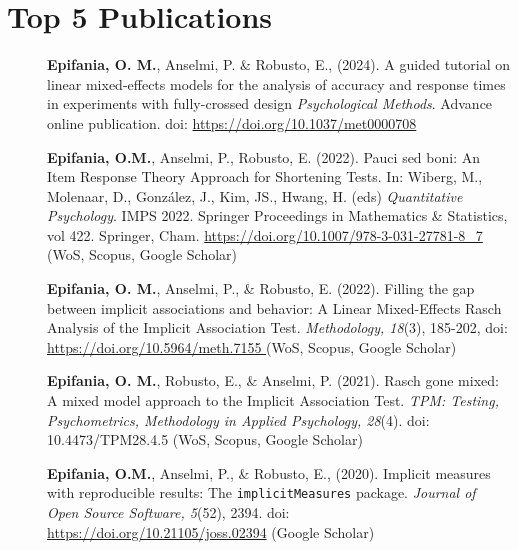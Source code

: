 \documentclass[letterpaper,12pt]{article}
\begin{document}
\section{Top 5 Publications}
\begin{description}
	\item[] \textbf{Epifania, O. M.}, Anselmi, P. \& Robusto, E., (2024).	A guided tutorial on linear mixed-effects models for the analysis of accuracy and response times in experiments with fully-crossed design \emph{Psychological Methods}. Advance online publication. doi: \url{https://doi.org/10.1037/met0000708}
	

	\item[] \textbf{Epifania, O.M.}, Anselmi, P., Robusto, E. (2022). Pauci sed boni: An Item Response Theory Approach for Shortening Tests. In: Wiberg, M., Molenaar, D., González, J., Kim, JS., Hwang, H. (eds) \emph{Quantitative Psychology}. IMPS 2022. Springer Proceedings in Mathematics \& Statistics, vol 422. Springer, Cham. \url{https://doi.org/10.1007/978-3-031-27781-8_7 } (WoS, Scopus, Google Scholar)
	
\item[] \textbf{Epifania, O. M.}, Anselmi, P., \& Robusto, E. (2022). Filling the gap between implicit associations and behavior: A Linear Mixed-Effects Rasch Analysis of the Implicit Association Test. \emph{Methodology, 18}(3), 185-202, doi: \url{https://doi.org/10.5964/meth.7155 } (WoS, Scopus, Google Scholar)

\item[] \textbf{Epifania, O. M.}, Robusto, E., \& Anselmi, P. (2021). Rasch gone mixed: A mixed model approach to the Implicit Association Test. \emph{TPM: Testing, Psychometrics, Methodology in Applied Psychology, 28}(4). doi: 10.4473/TPM28.4.5 (WoS, Scopus, Google Scholar)
\item[] \textbf{Epifania, O.M.}, Anselmi, P., \& Robusto, E., (2020). Implicit measures with reproducible results: The \texttt{implicitMeasures} package. \emph{Journal of Open Source Software, 5}(52), 2394. doi: \url{https://doi.org/10.21105/joss.02394} (Google Scholar)




\end{description}




\end{document}
